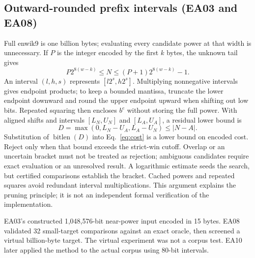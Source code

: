 \documentclass[11pt,a4paper]{article}
\newcommand{\bits}{\operatorname{bitlen}}
\begin{document}
\subsection{Outward-rounded prefix intervals (EA03 and EA08)}
Full enwik9 is one billion bytes; evaluating every candidate power at that width is unnecessary. If $P$ is the integer encoded by the first $k$ bytes, the unknown tail gives
\begin{equation}
 P2^{8(w-k)}\le N\le(P+1)2^{8(w-k)}-1.
\end{equation}
An interval $(l,h,s)$ represents $[l2^s,h2^s]$. Multiplying nonnegative intervals gives endpoint products; to keep a bounded mantissa, truncate the lower endpoint downward and round the upper endpoint upward when shifting out low bits. Repeated squaring then encloses $b^e$ without storing the full power. With aligned shifts and intervals $[L_N,U_N]$ and $[L_A,U_A]$, a residual lower bound is
\[
 D=\max(0,L_N-U_A,L_A-U_N)\le |N-A|.
\]
Substitution of $\bits(D)$ into Eq.~\eqref{eq:cost} is a lower bound on encoded cost. Reject only when that bound exceeds the strict-win cutoff. Overlap or an uncertain bracket must not be treated as rejection; ambiguous candidates require exact evaluation or an unresolved result. A logarithmic estimate seeds the search, but certified comparisons establish the bracket. Cached powers and repeated squares avoid redundant interval multiplications. This argument explains the pruning principle; it is not an independent formal verification of the implementation.

EA03's constructed 1,048,576-bit near-power input encoded in 15 bytes. EA08 validated 32 small-target comparisons against an exact oracle, then screened a virtual billion-byte target. The virtual experiment was not a corpus test. EA10 later applied the method to the actual corpus using 80-bit intervals. \cite{ea03,ea08,ea10}
\end{document}
